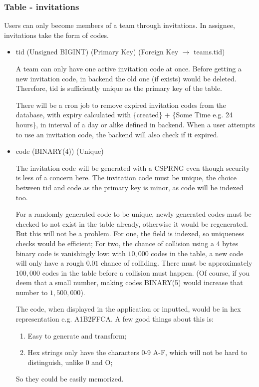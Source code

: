 \documentclass[12pt]{report}
\newcommand{\n}{\par}
\begin{document}
\subsubsection{Table - invitations} \label{data-layer.design.team-system.invitations}
Users can only become members of a team through invitations.
In assignee, invitations take the form of codes.
\begin{itemize}
	\item tid (Unsigned BIGINT) (Primary Key) (Foreign Key $\rightarrow$ teams.tid)\n
	      A team can only have one active invitation code at once.
	      Before getting a new invitation code, in backend the old one (if exists) would be deleted.
	      Therefore, tid is sufficiently unique as the primary key of the table.\n
	      There will be a cron job to remove expired invitation codes from the database,
	      with expiry calculated with \{created\} + \{Some Time e.g. 24 hours\},
	      in interval of a day or alike defined in backend.
	      When a user attempts to use an invitation code, the backend will also check if it expired.
	\item code (BINARY(4)) (Unique)\n
	      The invitation code will be generated with a CSPRNG even though security is less of a concern here.
	      The invitation code must be unique, the choice between tid and code as the primary key is minor,
	      as code will be indexed too.\n
	      For a randomly generated code to be unique, newly generated codes must be checked to not exist in the table already,
	      otherwise it would be regenerated. But this will not be a problem.
	      For one, the field is indexed, so uniqueness checks would be efficient;
	      For two, the chance of collision using a 4 bytes binary code is vanishingly low:
	      with $10,000$ codes in the table, a new code will only have a rough $0.01$ chance of colliding.
	      There must be approximately $100,000$ codes in the table before a collision must happen.
	      (Of course, if you deem that a small number,
	      making codes BINARY(5) would increase that number to $1,500,000$).\n
	      The code, when displayed in the application or inputted,
	      would be in hex representation e.g. A1B2FFCA.
	      A few good things about this is:
	      \begin{enumerate}
		      \item Easy to generate and transform;
		      \item Hex strings only have the characters 0-9 A-F, which will not be hard to distinguish, unlike 0 and O;
	      \end{enumerate}
	      So they could be easily memorized.
\end{itemize}
\end{document}
